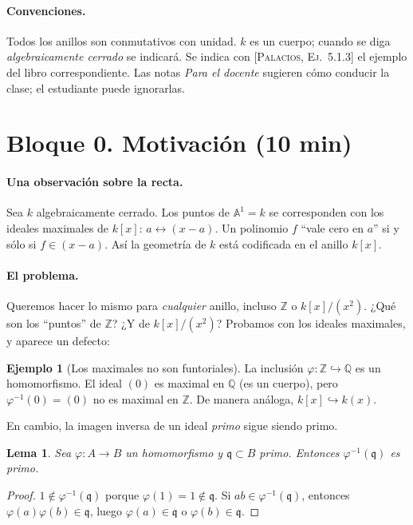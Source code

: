 \documentclass[11pt,a4paper]{article}
\newcommand{\A}{\mathbb{A}}
\newcommand{\ZZ}{\mathbb{Z}}
\newcommand{\QQ}{\mathbb{Q}}
\newcommand{\qq}{\mathfrak{q}}
\theoremstyle{plain}
\newtheorem{lema}[teorema]{Lema}
\theoremstyle{definition}
\newtheorem{ejemplo}[teorema]{Ejemplo}
\theoremstyle{remark}
\newcounter{ej}
\newcommand{\libro}[1]{\textsc{[Palacios, #1]}}
\begin{document}
\paragraph{Convenciones.} Todos los anillos son conmutativos con unidad. $k$ es un cuerpo; cuando se diga \emph{algebraicamente cerrado} se indicará. Se indica con \libro{Ej.~5.1.3} el ejemplo del libro correspondiente. Las notas \emph{Para el docente} sugieren cómo conducir la clase; el estudiante puede ignorarlas.

\section{Bloque 0. Motivación (10 min)}

\paragraph{Una observación sobre la recta.} Sea $k$ algebraicamente cerrado. Los puntos de $\A^1=k$ se corresponden con los ideales maximales de $k[x]$: $a\leftrightarrow(x-a)$. Un polinomio $f$ ``vale cero en $a$'' si y sólo si $f\in(x-a)$. Así la geometría de $k$ está codificada en el anillo $k[x]$.

\paragraph{El problema.} Queremos hacer lo mismo para \emph{cualquier} anillo, incluso $\ZZ$ o $k[x]/(x^2)$. ¿Qué son los ``puntos'' de $\ZZ$? ¿Y de $k[x]/(x^2)$? Probamos con los ideales maximales, y aparece un defecto:

\begin{ejemplo}[{Los maximales no son funtoriales}]\label{ej:no-max}
La inclusión $\varphi:\ZZ\hookrightarrow\QQ$ es un homomorfismo. El ideal $(0)$ es maximal en $\QQ$ (es un cuerpo), pero $\varphi^{-1}(0)=(0)$ no es maximal en $\ZZ$. De manera análoga, $k[x]\hookrightarrow k(x)$.
\end{ejemplo}

En cambio, la imagen inversa de un ideal \emph{primo} sigue siendo primo.

\begin{lema}\label{lema:contraccion}
Sea $\varphi:A\to B$ un homomorfismo y $\qq\subset B$ primo. Entonces $\varphi^{-1}(\qq)$ es primo.
\end{lema}
\begin{proof}
$1\notin\varphi^{-1}(\qq)$ porque $\varphi(1)=1\notin\qq$. Si $ab\in\varphi^{-1}(\qq)$, entonces $\varphi(a)\varphi(b)\in\qq$, luego $\varphi(a)\in\qq$ o $\varphi(b)\in\qq$.
\end{proof}
\end{document}
